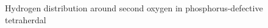 \documentclass[11pt]{article}
\begin{document}
\begin{figure}[H]
\begin{minipage}[h]{0.5\linewidth}
\end{minipage}
\hfill
\begin{minipage}[h]{0.5\linewidth}
\end{minipage}
\caption{Hydrogen distribution around second oxygen in phosphorus-defective tetraherdal }
\label{O2Finitialfinal}
\end{figure}
\end{document}
